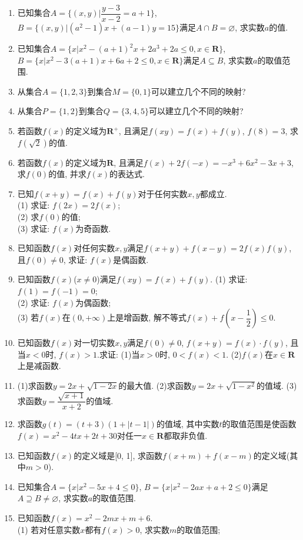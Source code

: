 \documentclass[10pt,a4paper]{article}
\begin{document}
\begin{enumerate}[1.]
\item 已知集合$A=\{(x,y)|\dfrac{y-3}{x-2}=a+1\}$, $B=\{(x,y)|(a^2-1)x+(a-1)y=15\}$满足$A\cap B=\varnothing$, 求实数$a$的值.
\item 已知集合$A=\{x|x^2-(a+1)^2x+2a^3+2a\le 0,x\in \mathbf{R}\}$, $B=\{x|x^2-3(a+1)x+6a+2\le 0,x\in \mathbf{R}\}$满足$A\subseteq B$, 求实数$a$的取值范围.
\item 从集合$A=\{1,2,3\}$到集合$M=\{0,1\}$可以建立几个不同的映射?
\item 从集合$P=\{1,2\}$到集合$Q=\{3,4,5\}$可以建立几个不同的映射?
\item 若函数$f(x)$的定义域为$\mathbf{R}^+$, 且满足$f(xy)=f(x)+f(y)$, $f(8)=3$, 求$f(\sqrt 2)$的值.
\item 若函数$f(x)$的定义域为$\mathbf{R}$, 且满足$f(x)+2f(-x)=-x^3+6x^2-3x+3$, 求$f(0)$的值, 并求$f(x)$的表达式.
\item 已知$f(x+y)=f(x)+f(y)$对于任何实数$x,y$都成立.\\
(1) 求证: $f(2x)=2f(x)$;\\
(2) 求$f(0)$的值;\\
(3) 求证: $f(x)$为奇函数.
\item 已知函数$f(x)$对任何实数$x,y$满足$f(x+y)+f(x-y)=2f(x)f(y)$, 且$f(0)\ne 0$, 求证: $f(x)$是偶函数.
\item 已知函数$f(x)$($x\ne 0$)满足$f(xy)=f(x)+f(y)$.
(1) 求证: $f(1)=f(-1)=0$;\\
(2) 求证: $f(x)$为偶函数;\\
(3) 若$f(x)$在$(0,+\infty)$上是增函数, 解不等式$f(x)+f(x-\dfrac 12)\le 0$.
\item 已知函数$f(x)$对一切实数$x,y$满足$f(0)\ne 0$, $f(x+y)=f(x)\cdot f(y)$, 且当$x<0$时, $f(x)>1$.求证:
(1)当$x>0$时, $0<f(x)<1$.
(2)$f(x)$在$x\in \mathbf{R}$上是减函数.
\item (1)求函数$y=2x+\sqrt {1-2x}$的最大值.
(2)求函数$y=2x+\sqrt {1-x^2}$的值域.
(3)求函数$y=\dfrac{\sqrt {x+1}}{x+2}$的值域.
\item 求函数$g(t)=(t+3)(1+|t-1|)$的值域, 其中实数$t$的取值范围是使函数$f(x)=x^2-4tx+2t+30$对任一$x\in \mathbf{R}$都取非负值.
\item 已知函数$f(x)$的定义域是[0, 1], 求函数$f(x+m)+f(x-m)$的定义域(其中$m>0$).
\item 已知集合$A=\{x|x^2-5x+4\le 0\}$, $B=\{x|x^2-2ax+a+2\le 0\}$满足$A\supseteq B\ne \varnothing$, 求实数$a$的取值范围.
\item 已知函数$f(x)=x^2-2mx+m+6$.\\
(1) 若对任意实数$x$都有$f(x)>0$, 求实数$m$的取值范围;\\

\end{enumerate}
\end{document}
